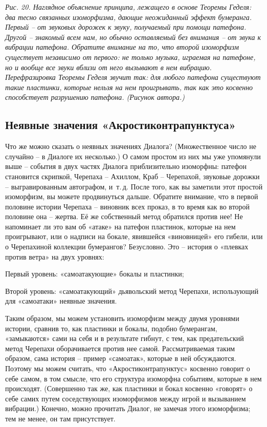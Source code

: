\documentclass[../main.tex]{subfiles}
\begin{document}
\emph{Рис. 20. Наглядное объяснение принципа, лежащего в основе Теоремы Геделя: два тесно связанных изоморфизма, дающие неожиданный эффект бумеранга. Первый \--- от звуковых дорожек к звуку, получаемый при помощи патефона. Другой \--- знакомый всем нам, но обычно оставляемый без внимания \--- от звука к вибрации патефона. Обратите внимание на то, что второй изоморфизм существует независимо от первого: не только музыка, играемая на патефоне, но и вообще все звуки вблизи от него вызывают в нем вибрацию. Перефразировка Теоремы Геделя звучит так: для любого патефона существуют такие пластинки, которые нельзя на нем проигрывать, так как это косвенно способствует разрушению патефона. (Рисунок автора.)}


\subsection{Неявные значения «Акростиконтрапунктуса»}

Что же можно сказать о неявных значениях Диалога? (Множественное число не случайно \--- в Диалоге их несколько.) О самом простом из них мы уже упомянули выше \--- события в двух частях Диалога приблизительно изоморфны: патефон становится скрипкой, Черепаха \--- Ахиллом, Краб \--- Черепахой, звуковые дорожки \--- выгравированным автографом, и~т.\,д. После того, как вы заметили этот простой изоморфизм, вы можете продвинуться дальше. Обратите внимание, что в первой половине истории Черепаха \--- виновник всех проказ, в то время как во второй половине она \--- жертва. Её же собственный метод обратился против нее! Не напоминает ли это вам об «атаке» на патефон пластинок, которые на нем проигрывают, или о надписи на бокале, явившейся «виновницей» его гибели, или о Черепахиной коллекции бумерангов? Безусловно. Это \--- история о «плевках против ветра» на двух уровнях:

\begin{block}
    Первый уровень: «самоатакующие» бокалы и пластинки;

    Второй уровень: «самоатакующий» дьявольский метод Черепахи, использующий для «самоатаки» неявные значения.
\end{block}

Таким образом, мы можем установить изоморфизм между двумя уровнями истории, сравнив то, как пластинки и бокалы, подобно бумерангам, «замыкаются» сами на себя и в результате гибнут, с тем, как предательский метод Черепахи оборачивается против нее самой. Рассматриваемая таким образом, сама история \--- пример «самоатак», которые в ней обсуждаются. Поэтому мы можем считать, что «Акростиконтрапунктус» косвенно говорит о себе самом, в том смысле, что его структура изоморфна событиям, которые в нем происходят. (Совершенно так же, как пластинки и бокал косвенно «говорят» о себе самих путем соседствующих изоморфизмов между игрой и вызыванием вибрации.) Конечно, можно прочитать Диалог, не замечая этого изоморфизма; тем не менее, он там присутствует.
\end{document}
